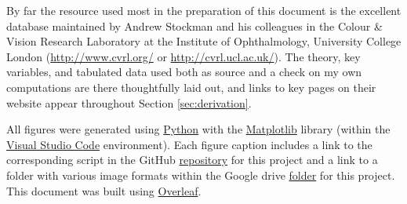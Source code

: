 \documentclass{article}
\begin{document}
By far the resource used most in the preparation of this document is the excellent database maintained by Andrew Stockman and his colleagues in the Colour \& Vision Research Laboratory at the Institute of Ophthalmology, University College London (\url{http://www.cvrl.org/} or \url{http://cvrl.ucl.ac.uk/}).  The theory, key variables, and tabulated data used both as source and a check on my own computations are there thoughtfully laid out, and links to key pages on their website appear throughout Section \ref{sec:derivation}.

All figures were generated using \href{https://www.python.org/}{Python} with the \href{https://matplotlib.org/}{Matplotlib} library (within the \href{https://code.visualstudio.com/}{Visual Studio Code} environment).  Each figure caption includes a link to the corresponding script in the GitHub \href{https://github.com/kyle-c-mcdermott/visualizing-color-space}{repository} for this project and a link to a folder with various image formats within the Google drive \href{https://drive.google.com/drive/folders/1jPUTIYndDIz3u3UEHpQn7Y6sarJDSm_q?usp=sharing}{folder} for this project.  This document was built using \href{https://www.overleaf.com/read/grwgzthdfpgb}{Overleaf}.
\end{document}
